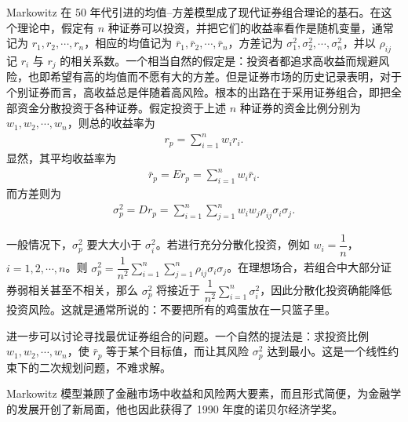 \documentclass[../../main.tex]{subfiles}
\begin{document}
\begin{example}[现代证券组合理论]\label{example:ch04-证券组合}
Markowitz 在 50 年代引进的均值--方差模型成了现代证券组合理论的基石。在这个理论中，假定有 $n$ 种证券可以投资，并把它们的收益率看作是随机变量，通常记为 $r_1,r_2,\cdots,r_n$，相应的均值记为 $\bar{r}_1,\bar{r}_2,\cdots,\bar{r}_n$，方差记为 $\sigma_1^2,\sigma_2^2,\cdots,\sigma_n^2$，并以 $\rho_{ij}$ 记 $r_i$ 与 $r_j$ 的相关系数。一个相当自然的假定是：投资者都追求高收益而规避风险，也即希望有高的均值而不愿有大的方差。但是证券市场的历史记录表明，对于个别证券而言，高收益总是伴随着高风险。根本的出路在于采用证券组合，即把全部资金分散投资于各种证券。假定投资于上述 $n$ 种证券的资金比例分别为 $w_1,w_2,\cdots,w_n$，则总的收益率为
\begin{align}
r_p=\sum_{i=1}^n w_i r_i.\label{align:ch04-组合收益}
\end{align}
显然，其平均收益率为
\begin{align}
\bar{r}_p=Er_p=\sum_{i=1}^n w_i\bar{r}_i.\label{align:ch04-组合均值}
\end{align}
而方差则为
\begin{align}
\sigma_p^2=Dr_p=\sum_{i=1}^n\sum_{j=1}^n w_i w_j\rho_{ij}\sigma_i\sigma_j.\label{align:ch04-组合方差}
\end{align}

一般情况下，$\sigma_p^2$ 要大大小于 $\sigma_i^2$。若进行充分分散化投资，例如 $w_i=\dfrac{1}{n}$，$i=1,2,\cdots,n$。则 $\sigma_p^2=\dfrac{1}{n^2}\sum_{i=1}^n\sum_{j=1}^n\rho_{ij}\sigma_i\sigma_j$。在理想场合，若组合中大部分证券弱相关甚至不相关，那么 $\sigma_p^2$ 将接近于 $\dfrac{1}{n^2}\sum_{i=1}^n\sigma_i^2$，因此分散化投资确能降低投资风险。这就是通常所说的：不要把所有的鸡蛋放在一只篮子里。

进一步可以讨论寻找最优证券组合的问题。一个自然的提法是：求投资比例 $w_1,w_2,\cdots,w_n$，使 $\bar{r}_p$ 等于某个目标值，而让其风险 $\sigma_p^2$ 达到最小。这是一个线性约束下的二次规划问题，不难求解。

Markowitz 模型兼顾了金融市场中收益和风险两大要素，而且形式简便，为金融学的发展开创了新局面，他也因此获得了 1990 年度的诺贝尔经济学奖。
\end{example}
\end{document}
